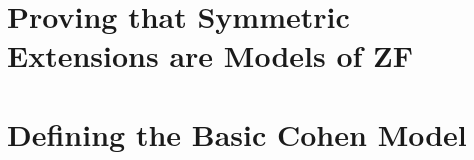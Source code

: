 \documentclass{report}
\newcommand{\Pbb}{\mathbb{P}}
\begin{document}
\begin{comment}
  \subsection{$\Pbb$-names}
\subsection{Automorphisms}
\subsection{Hereditarily Symmetric Names}
\subsection{Symmetric Extensions}
\end{comment}

\section{Proving that Symmetric Extensions are Models of ZF}
\begin{comment}
\subsection{Relativized Forcing Relation $\Vdash_{\mathrm{HS}}$}
\subsection{The Symmetric Lemma}
\subsection{Separation}
\subsection{Replacement}
\subsection{Other Axioms}
\end{comment}

\section{Defining the Basic Cohen Model}
\begin{comment}
\subsection{The Notion of Forcing}
\subsection{The Group of Automorphisms}
\subsection{The Normal Filter}
\end{comment}
\end{document}
